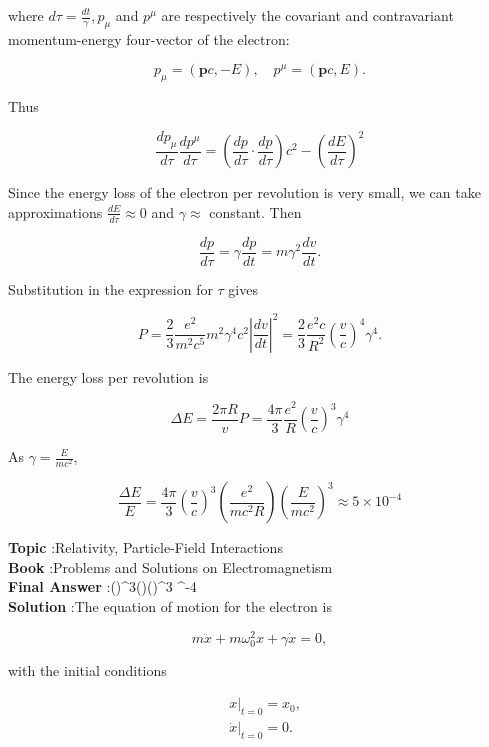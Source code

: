 \documentclass[10pt]{article}
\begin{document}
where $d \tau=\frac{d t}{\gamma}, p_{\mu}$ and $p^{\mu}$ are respectively the covariant and contravariant momentum-energy four-vector of the electron:

$$
p_{\mu}=(\mathbf{p} c,-E), \quad p^{\mu}=(\mathbf{p} c, E) .
$$

Thus

$$
\frac{d p_{\mu}}{d \tau} \frac{d p^{\mu}}{d \tau}=\left(\frac{d p}{d \tau} \cdot \frac{d p}{d \tau}\right) c^{2}-\left(\frac{d E}{d \tau}\right)^{2}
$$



Since the energy loss of the electron per revolution is very small, we can take approximations $\frac{d E}{d \tau} \approx 0$ and $\gamma \approx$ constant. Then

$$
\frac{d p}{d \tau}=\gamma \frac{d p}{d t}=m \gamma^{2} \frac{d v}{d t} .
$$

Substitution in the expression for $\tau$ gives

$$
P=\frac{2}{3} \frac{e^{2}}{m^{2} c^{5}} m^{2} \gamma^{4} c^{2}\left|\frac{d v}{d t}\right|^{2}=\frac{2}{3} \frac{e^{2} c}{R^{2}}\left(\frac{v}{c}\right)^{4} \gamma^{4} .
$$

The energy loss per revolution is

$$
\Delta E=\frac{2 \pi R}{v} P=\frac{4 \pi}{3} \frac{e^{2}}{R}\left(\frac{v}{c}\right)^{3} \gamma^{4}
$$

As $\gamma=\frac{E}{m c^{2}}$,

$$
\frac{\Delta E}{E}=\frac{4 \pi}{3}\left(\frac{v}{c}\right)^{3}\left(\frac{e^{2}}{m c^{2} R}\right)\left(\frac{E}{m c^{2}}\right)^{3} \approx 5 \times 10^{-4}
$$

\textbf{Topic} :Relativity, Particle-Field Interactions\\
\textbf{Book} :Problems and Solutions on Electromagnetism\\
\textbf{Final Answer} :\left(\right)^{3}\left(\right)\left(\right)^{3}  ^{-4}\\


\textbf{Solution} :The equation of motion for the electron is

$$
m \ddot{x}+m \omega_{0}^{2} x+\gamma \dot{x}=0,
$$

with the initial conditions

$$
\begin{aligned}
&\left.x\right|_{t=0}=x_{0}, \\
&\left.\dot{x}\right|_{t=0}=0 .
\end{aligned}
$$
\end{document}
